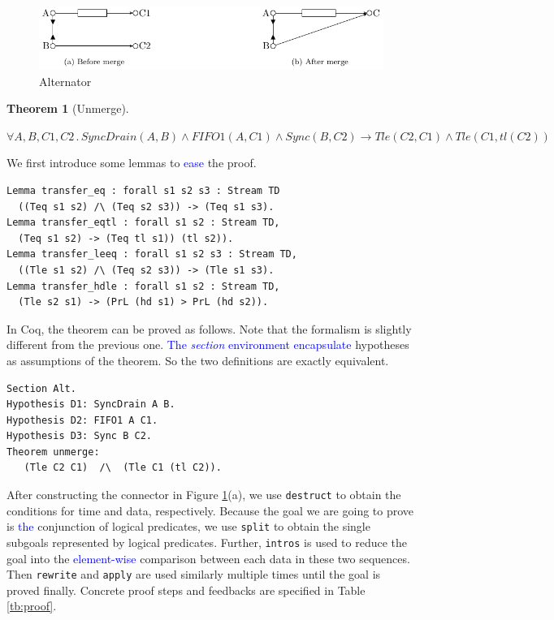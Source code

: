 \documentclass[preprint,3p]{elsarticle}
\newcommand{\liyi}[1]{\textcolor{blue}{#1}}
\newcommand{\xy}[1]{{#1}}
\newtheorem{theorem}{Theorem}[section]
\begin{document}
\begin{figure}
\vspace{0.5cm}
\centering
\includegraphics[width=.8\textwidth]{alternator.pdf}
\caption{Alternator}
\label{fig:alternator}
\end{figure}

\begin{theorem}[Unmerge]\label{the:alternator}

$\forall A,B,C1,C2\,.\,
SyncDrain(A,B)\land FIFO1(A,C1)\land Sync(B,C2)  \rightarrow Tle(C2,C1) \wedge Tle(C1, tl(C2))
$
\end{theorem}

We first introduce some lemmas to \liyi{ease} the proof.
\begin{lstlisting}[language=coq]
Lemma transfer_eq : forall s1 s2 s3 : Stream TD
  ((Teq s1 s2) /\ (Teq s2 s3)) -> (Teq s1 s3).
Lemma transfer_eqtl : forall s1 s2 : Stream TD,
  (Teq s1 s2) -> (Teq tl s1)) (tl s2)).
Lemma transfer_leeq : forall s1 s2 s3 : Stream TD,
  ((Tle s1 s2) /\ (Teq s2 s3)) -> (Tle s1 s3).
Lemma transfer_hdle : forall s1 s2 : Stream TD,
  (Tle s2 s1) -> (PrL (hd s1) > PrL (hd s2)).
\end{lstlisting}

In Coq, the theorem can be proved as follows. Note that the formalism is slightly different from the previous one. \liyi{The \emph{section} environment encapsulate} hypotheses as assumptions of the theorem. So the two definitions are exactly equivalent.

\begin{lstlisting}[language=coq]
Section Alt.
Hypothesis D1: SyncDrain A B.
Hypothesis D2: FIFO1 A C1.
Hypothesis D3: Sync B C2.
Theorem unmerge:
   (Tle C2 C1)  /\  (Tle C1 (tl C2)).
\end{lstlisting}

After constructing the connector in Figure \ref{fig:alternator}(a), we use \texttt{destruct} to obtain the conditions for time and data, respectively.
\xy{Because the goal we are going to prove} is \liyi{the} conjunction of logical predicates, we use \texttt{split} to obtain the single subgoals represented by logical predicates. \xy{Further, \texttt{intros} is used to reduce the goal into the \liyi{element-wise} comparison between each data in these two sequences.} Then \texttt{rewrite} and \texttt{apply} are
used similarly multiple times until the goal is proved finally. %
Concrete proof steps and feedbacks are specified in Table \ref{tb:proof}.
\end{document}
